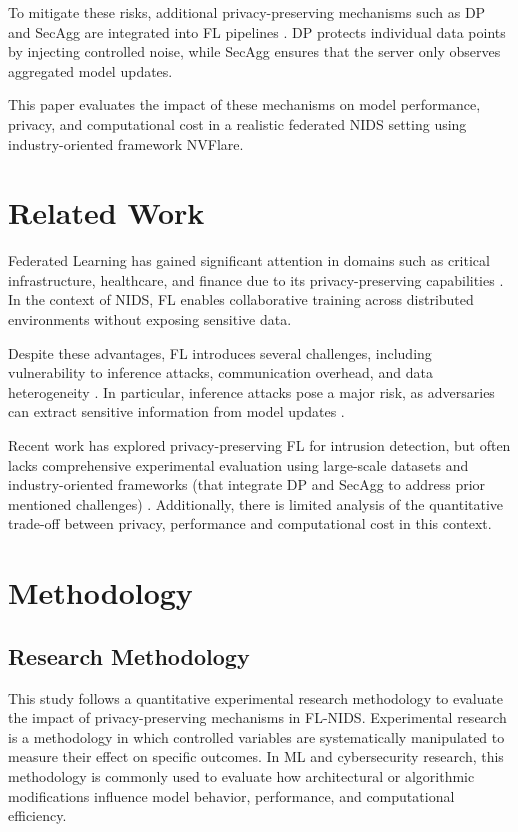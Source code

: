 \documentclass[conference]{IEEEtran}
\begin{document}
To mitigate these risks, additional privacy-preserving mechanisms such as DP and SecAgg are integrated into FL pipelines \cite{khraisat2024}. DP protects individual data points by injecting controlled noise, while SecAgg ensures that the server only observes aggregated model updates.

This paper evaluates the impact of these mechanisms on model performance, privacy, and computational cost in a realistic federated NIDS setting using industry-oriented framework NVFlare.

\section{Related Work}

Federated Learning has gained significant attention in domains such as critical infrastructure, healthcare, and finance due to its privacy-preserving capabilities \cite{yurdem2024}. In the context of NIDS, FL enables collaborative training across distributed environments without exposing sensitive data.

Despite these advantages, FL introduces several challenges, including vulnerability to inference attacks, communication overhead, and data heterogeneity \cite{khraisat2024}. In particular, inference attacks pose a major risk, as adversaries can extract sensitive information from model updates \cite{ameria2023}.

Recent work has explored privacy-preserving FL for intrusion detection, but often lacks comprehensive experimental evaluation using large-scale datasets and  industry-oriented frameworks (that integrate DP and SecAgg to address prior mentioned challenges) \cite{torre2024}. Additionally, there is limited analysis of the quantitative trade-off between privacy, performance and computational cost in this context.

\section{Methodology}

\subsection{Research Methodology}

This study follows a quantitative experimental research methodology to evaluate the impact of privacy-preserving mechanisms in FL-NIDS. Experimental research is a methodology in which controlled variables are systematically manipulated to measure their effect on specific outcomes. In ML and cybersecurity research, this methodology is commonly used to evaluate how architectural or algorithmic modifications influence model behavior, performance, and computational efficiency.
\end{document}
